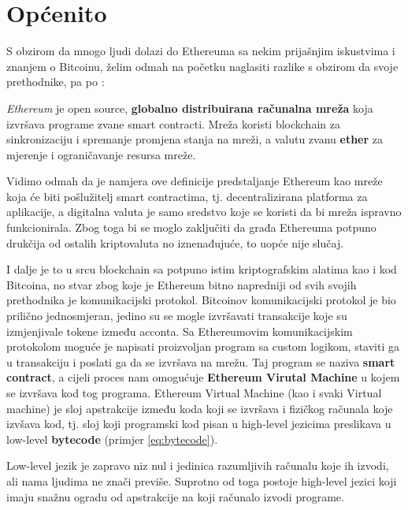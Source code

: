 \documentclass[12pt]{report}
\begin{document}
\section{Općenito}

S obzirom da mnogo ljudi dolazi do Ethereuma sa nekim prijašnjim iskustvima i znanjem o Bitcoinu, želim odmah na početku naglasiti razlike s obzirom da svoje prethodnike, pa po \cite{ethbook}:

\begin{definicija}
\textit{Ethereum} je open source, \textbf{globalno distribuirana računalna mreža} koja izvršava programe zvane smart contracti. Mreža koristi blockchain za sinkronizaciju i spremanje promjena stanja na mreži, a valutu zvanu \textbf{ether} za mjerenje i ograničavanje resursa mreže.
\end{definicija}

Vidimo odmah da je namjera ove definicije predstaljanje Ethereum kao mreže koja će biti pošlužitelj smart contractima, tj. decentralizirana platforma za aplikacije, a digitalna valuta je samo sredstvo koje se koristi da bi mreža ispravno funkcionirala. Zbog toga bi se moglo zaključiti da građa Ethereuma potpuno drukčija od ostalih kriptovaluta no iznenađujuće, to uopće nije slučaj.

I dalje je to u srcu blockchain sa potpuno istim kriptografskim alatima kao i kod Bitcoina, no stvar zbog koje je Ethereum bitno napredniji od svih svojih prethodnika je komunikacijski protokol. Bitcoinov komunikacijski protokol je bio prilično jednosmjeran, jedino su se mogle izvršavati transakcije koje su izmjenjivale tokene između acconta. Sa Ethereumovim komunikacijskim protokolom moguće je napisati proizvoljan program sa custom logikom, staviti ga u transakciju i poslati ga da se izvršava na mrežu. Taj program se naziva \textbf{smart contract}, a cijeli proces nam omogućuje \textbf{Ethereum Virutal Machine} u kojem se izvršava kod tog programa. Ethereum Virtual Machine (kao i svaki Virtual machine) je sloj apstrakcije između koda koji se izvršava i fizičkog računala koje izvšava kod, tj. sloj koji programski kod pisan u high-level jezicima preslikava u low-level \textbf{bytecode} (primjer \ref{eq:bytecode}).

\begin{napomena}
Low-level jezik je zapravo niz nul i jedinica razumljivih računalu koje ih izvodi, ali nama ljudima ne znači previše. Suprotno od toga postoje high-level jezici koji imaju snažnu ogradu od apstrakcije na koji računalo izvodi programe.
\end{napomena}
\end{document}
